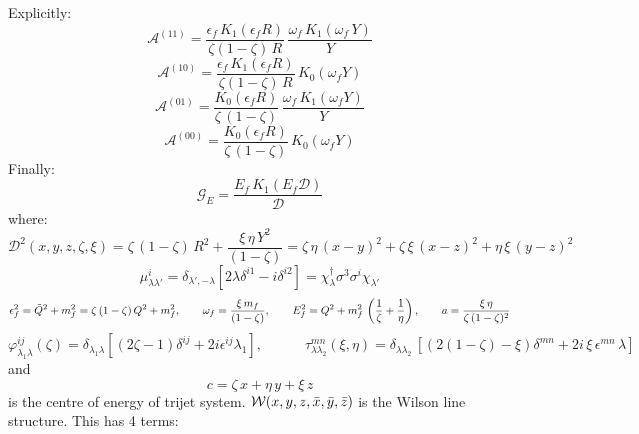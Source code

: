 \documentclass[9pt]{article}
\numberwithin{equation}{section}
\begin{document}
Explicitly: 
$$\mathcal{A}^{(11)} = \frac{\epsilon_{f}\,K_{1}(\epsilon_{f} R)}{\zeta(1-\zeta)\,R}\,\frac{\omega_{f}\,K_{1}(\omega_{f}\,Y)}{Y}$$
$$\mathcal{A}^{(10)} = \frac{\epsilon_{f}\,K_{1}(\epsilon_{f}R)}{\zeta(1-\zeta)\,R}\, K_{0}(\omega_{f}Y)$$
$$\mathcal{A}^{(01)} = \frac{K_{0}(\epsilon_{f}R)}{\zeta\,(1-\zeta)}\,\frac{\omega_{f}\,K_{1}(\omega_{f}Y)}{Y}$$
$$\mathcal{A}^{(00)} = \frac{K_{0}(\epsilon_{f}R)}{\zeta\,(1-\zeta)}\,K_{0}(\omega_{f}Y)$$
Finally:
$$\mathcal{G}_{E} = \frac{E_{f}\,K_{1}(E_{f}\mathcal{D})}{\mathcal{D}}$$
where: 
$$\mathcal{D}^{2}(x,y,z,\zeta,\xi) = \zeta\,(1-\zeta)\,R^{2} + \frac{\xi\,\eta\,Y^{2}}{(1-\zeta)} = \zeta\,\eta\,(x-y)^{2} + \zeta\,\xi\,(x-z)^{2} + \eta\,\xi\,(y-z)^{2}$$
$$\mu^{i}_{\lambda\lambda'} = \delta_{\lambda',-\lambda}\left[2\lambda\delta^{i1} - i\delta^{i2}\right] = \chi^{\dagger}_{\lambda}\sigma^{3}\sigma^{i}\chi_{\lambda'}$$
$$\epsilon^{2}_{f} = \Tilde{Q}^{2}+ m^{2}_{f} = \zeta\, (1-\zeta)\,Q^{2} +m^{2}_{f}, \hspace{2em} \omega_{f} = \frac{\xi\,m_{f}}{(1-\zeta)}, \hspace{2em} E^{2}_{f} = Q^{2} +m^{2}_{f}\,\left(\frac{1}{\zeta} + \frac{1}{\eta}\right),\hspace{2em} a = \frac{\xi\,\eta}{\zeta\,(1-\zeta)^{2}}$$
$$\varphi^{ij}_{\lambda_{1}\lambda}(\zeta) = \delta_{\lambda_{1}\lambda}\left[(2\zeta -1)\delta^{ij} +2i\epsilon^{ij}\lambda_{1}\right],\hspace{3em} \tau^{mn}_{\lambda \lambda_{2}}(\xi,\eta) = \delta_{\lambda \lambda_{2}}\,\left[(2(1-\zeta)-\xi)\delta^{mn}+2i\,\xi\,\epsilon^{mn}\,\lambda\right] $$
and 
$$c = \zeta\,x +\eta\, y + \xi\,z$$ is the centre of energy of trijet system.
$\mathcal{W}(x,y,z,\Bar{x},\Bar{y},\Bar{z})$ is the Wilson line structure. This has 4 terms:
\end{document}
